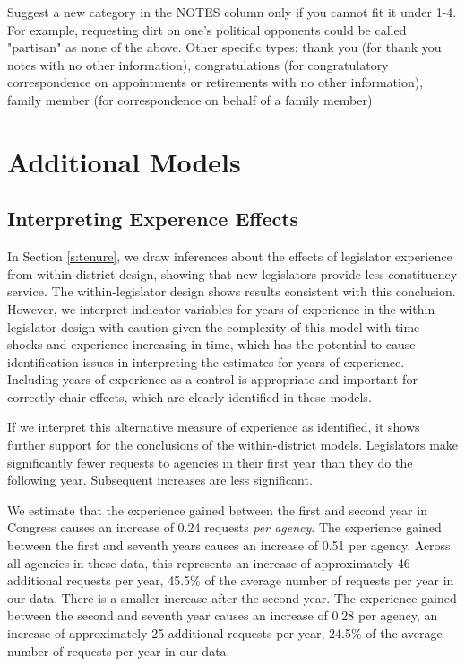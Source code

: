 \hfill\begin{minipage}{\dimexpr\textwidth-2cm}
	Suggest a new category in the NOTES column only if you cannot fit it under 1-4. For example, requesting dirt on one's political opponents could be called "partisan" as none of the above. Other specific types: thank you (for thank you notes with no other information), congratulations (for congratulatory correspondence on appointments or retirements with no other information), family member (for correspondence on behalf of a family member) \\
\end{minipage}

\clearpage


\section{Additional Models} \label{s:appendix_models}

\subsection{Interpreting Experence Effects }

In Section \ref{s:tenure}, we draw inferences about the effects of legislator experience from within-district design, showing that new legislators provide less constituency service. The within-legislator design shows results consistent with this conclusion. However, we interpret indicator variables for years of experience in the within-legislator design with caution given the complexity of this model with time shocks and experience increasing in time, which has the potential to cause identification issues in interpreting the estimates for years of experience. Including years of experience as a control is appropriate and important for correctly chair effects, which are clearly identified in these models.  

If we interpret this alternative measure of experience as identified, it shows further support for the conclusions of the within-district models. Legislators make significantly fewer requests to agencies in their first year than they do the following year. Subsequent increases are less significant.  

We estimate that the experience gained between the first and second year in Congress causes an increase of 0.24 requests \textit{per agency}. The experience gained between the first and seventh years causes an increase of 0.51 per agency. Across all  agencies in these data, this represents an increase of approximately 46 additional requests per year, 45.5\% of the average number of requests per year in our data. There is a smaller increase after the second year. The experience gained between the second and seventh year causes an increase of 0.28 per agency, an increase of approximately 25 additional requests per year, 24.5\% of the average number of requests per year in our data.

